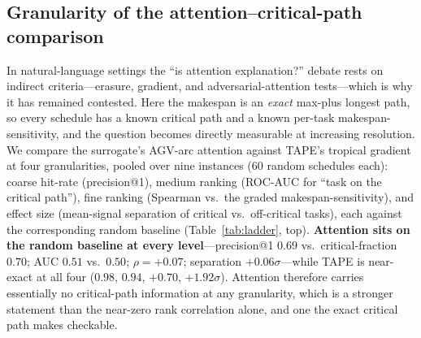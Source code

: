 \documentclass[11pt]{article}
\begin{document}
\subsection{Granularity of the attention--critical-path comparison}
\label{sec:ladder}
In natural-language settings the ``is attention explanation?'' debate rests on indirect
criteria---erasure, gradient, and adversarial-attention tests---which is why it has
remained contested. Here the makespan is an \emph{exact} max-plus longest path, so every
schedule has a known critical path and a known per-task makespan-sensitivity, and the
question becomes directly measurable at increasing resolution. We compare the surrogate's AGV-arc attention against
TAPE's tropical gradient at four granularities, pooled over nine instances ($60$ random
schedules each):
coarse hit-rate (precision@1), medium ranking (ROC-AUC for ``task on the critical path''),
fine ranking (Spearman vs.\ the graded makespan-sensitivity), and effect size (mean-signal
separation of critical vs.\ off-critical tasks), each against the corresponding random
baseline (Table~\ref{tab:ladder}, top). \textbf{Attention sits on the random
baseline at every level}---precision@1 $0.69$ vs.\ critical-fraction $0.70$; AUC $0.51$ vs.\
$0.50$; $\rho=+0.07$; separation $+0.06\sigma$---while TAPE is near-exact at all four
($0.98$, $0.94$, $+0.70$, $+1.92\sigma$). Attention therefore carries essentially no
critical-path information at any granularity, which is a stronger statement than the
near-zero rank correlation alone, and one the exact critical path makes checkable.
\end{document}
